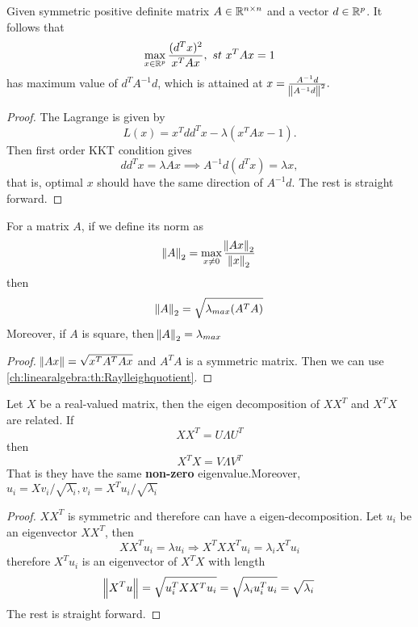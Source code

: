 \begin{refsection}
\begin{corollary}
	Given symmetric positive definite matrix $A\in \mathbb{R}^{n\times n}$ and a vector $d\in \mathbb{R}^p$. It follows that
	$$\max_{x\in\mathbb{R}^p} \frac{(d^T x)^2 }{x^TAx}, ~st~ x^TAx = 1$$
	has maximum value of $d^TA^{-1}d$, which is attained at $x = \frac{A^{-1}d}{\norm{A^{-1}d}^2}.$	
\end{corollary}
\begin{proof}
	The Lagrange is given by
	$$L(x) = x^Tdd^Tx - \lambda (x^TAx - 1).$$
	Then first order KKT condition gives
	$$dd^T x = \lambda Ax \implies A^{-1}d (d^Tx) = \lambda x,$$
	that is, optimal $x$ should have the same direction of $A^{-1}d$. The rest is straight forward. 
\end{proof}

\begin{corollary}\label{ch:linearalgebra:th:matrix2normeigenvalue}
	For a matrix $A$, if we define its norm as
	$$\norm{A}_2 = \max_{x\neq 0} \frac{\norm{Ax}_2}{\norm{x}_2}$$
	then
	$$\norm{A}_2 = \sqrt{\lambda_{max}(A^TA)}$$
	Moreover, if $A$ is square, then $\norm{A}_2 = \lambda_{max}$
\end{corollary}

\begin{proof}
	$\norm{Ax} = \sqrt{x^TA^TAx}$ and $A^TA$  is a symmetric matrix. Then we can use \autoref{ch:linearalgebra:th:Raylleighquotient}.
\end{proof}


\begin{theorem}\label{ch:linearalgebra:th:spectralpropertiesofXXTandXTX}
	Let $X$ be a real-valued matrix, then the eigen decomposition of $XX^T$ and $X^TX$ are related. If
	$$XX^T = U\Lambda U^T$$
	then
	$$X^TX = V\Lambda V^T$$
	That is they have the same \textbf{non-zero} eigenvalue.Moreover,
	$u_i = Xv_i/\sqrt{\lambda_i}, v_i = X^Tu_i/\sqrt{\lambda_i}$
\end{theorem}

\begin{proof}
	$XX^T$ is symmetric and therefore can have a eigen-decomposition. Let $u_i$ be an eigenvector $XX^T$, then $$XX^T u_i = \lambda u_i \Rightarrow X^TXX^Tu_i = \lambda_i X^Tu_i$$
	therefore $X^Tu_i$ is an eigenvector of $X^TX$ with length $$\norm{X^Tu} = \sqrt{u_i^TXX^Tu_i} = \sqrt{\lambda_i u_i^Tu_i}=\sqrt{\lambda_i}$$
	The rest is straight forward.
\end{proof}



\end{refsection}
